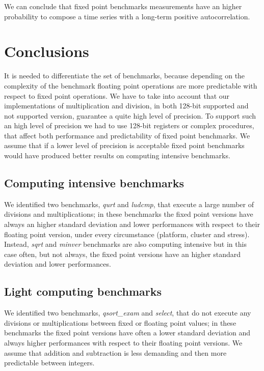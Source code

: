 We can conclude that fixed point benchmarks measurements have an higher probability to compose a time series with a long-term positive autocorrelation.
\clearpage
\section{Conclusions}
It is needed to differentiate the set of benchmarks, because depending on the complexity of the benchmark floating point operations are more predictable with respect to fixed point operations.\newline
We have to take into account that our implementations of multiplication and division, in both 128-bit supported and not supported version, guarantee a quite high level of precision.
To support such an high level of precision we had to use 128-bit registers or complex procedures, that affect both performance and predictability of fixed point benchmarks. We assume that if a lower level of precision is acceptable fixed point benchmarks would have produced better results on computing intensive benchmarks.
 
\subsection{Computing intensive benchmarks}
We identified two benchmarks, \textit{qurt} and \textit{ludcmp}, that execute a large number of divisions and multiplications; in these benchmarks the fixed point versions have always an higher standard deviation and lower performances with respect to their floating point version, under every circumstance (platform, cluster and stress).
Instead, \textit{sqrt} and \textit{minver} benchmarks are also computing intensive but in this case often, but not always, the fixed point versions have an higher standard deviation and lower performances.

\subsection{Light computing benchmarks}
We identified two benchmarks, \textit{qsort\_exam} and \textit{select}, that do not execute any divisions or multiplications between fixed or floating point values; in these benchmarks the fixed point versions have often a lower standard deviation and always higher performances with respect to their floating point versions.\newline
We assume that addition and subtraction is less demanding and then more predictable between integers.

